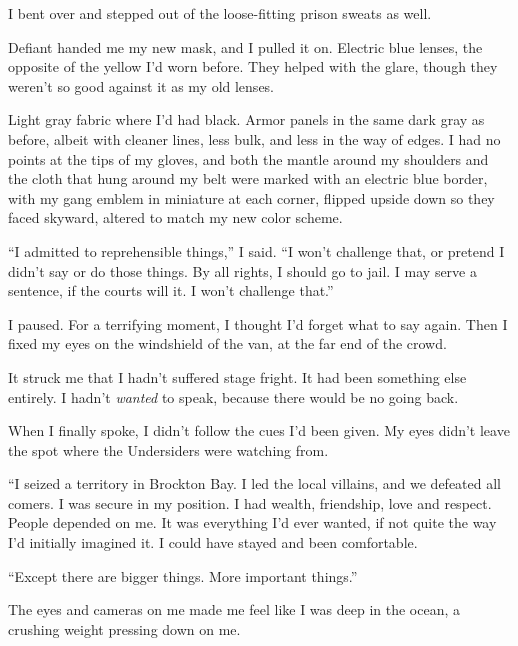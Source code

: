 I bent over and stepped out of the loose-fitting prison sweats as well.



Defiant handed me my new mask, and I pulled it on.  Electric blue lenses, the opposite of the yellow I'd worn before.  They helped with the glare, though they weren't so good against it as my old lenses.



Light gray fabric where I'd had black.  Armor panels in the same dark gray as before, albeit with cleaner lines, less bulk, and less in the way of edges.  I had no points at the tips of my gloves, and both the mantle around my shoulders and the cloth that hung around my belt were marked with an electric blue border, with my gang emblem in miniature at each corner, flipped upside down so they faced skyward, altered to match my new color scheme.



``I admitted to reprehensible things,'' I said.  ``I won't challenge that, or pretend I didn't say or do those things.  By all rights, I should go to jail.  I may serve a sentence, if the courts will it.  I won't challenge that.''



I paused.  For a terrifying moment, I thought I'd forget what to say again.  Then I fixed my eyes on the windshield of the van, at the far end of the crowd.



It struck me that I hadn't suffered stage fright.  It had been something else entirely.  I hadn't \emph{wanted} to speak, because there would be no going back.



When I finally spoke, I didn't follow the cues I'd been given.  My eyes didn't leave the spot where the Undersiders were watching from.



``I seized a territory in Brockton Bay.  I led the local villains, and we defeated all comers.  I was secure in my position.  I had wealth, friendship, love and respect.  People depended on me.  It was everything I'd ever wanted, if not quite the way I'd initially imagined it.  I could have stayed and been comfortable.



``Except there are bigger things.  More important things.''



The eyes and cameras on me made me feel like I was deep in the ocean, a crushing weight pressing down on me.



